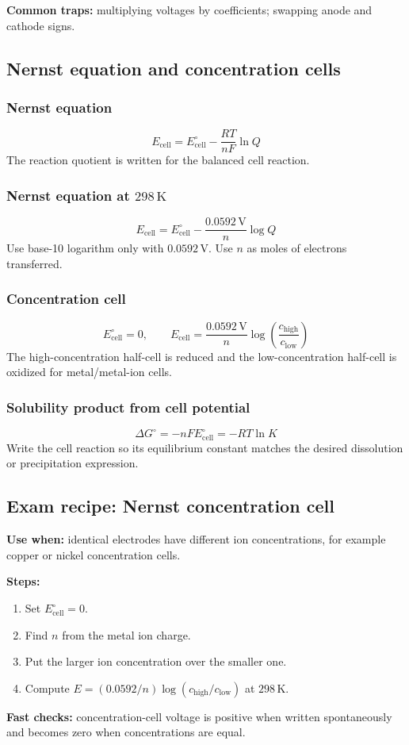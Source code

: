 \textbf{Common traps:} multiplying voltages by coefficients; swapping anode and cathode signs.

\subsection{Nernst equation and concentration cells}

\subsubsection{Nernst equation}
\[
E_{\mathrm{cell}}=E^\circ_{\mathrm{cell}}-\frac{RT}{nF}\ln Q
\]
The reaction quotient is written for the balanced cell reaction.

\subsubsection{Nernst equation at \(298\,\mathrm K\)}
\[
E_{\mathrm{cell}}=E^\circ_{\mathrm{cell}}-\frac{0.0592\,\mathrm V}{n}\log Q
\]
Use base-10 logarithm only with \(0.0592\,\mathrm V\). Use \(n\) as moles of electrons transferred.

\subsubsection{Concentration cell}
\[
E^\circ_{\mathrm{cell}}=0, \qquad
E_{\mathrm{cell}}=\frac{0.0592\,\mathrm V}{n}\log\left(\frac{c_{\mathrm{high}}}{c_{\mathrm{low}}}\right)
\]
The high-concentration half-cell is reduced and the low-concentration half-cell is oxidized for metal/metal-ion cells.

\subsubsection{Solubility product from cell potential}
\[
\Delta G^\circ=-nFE^\circ_{\mathrm{cell}}=-RT\ln K
\]
Write the cell reaction so its equilibrium constant matches the desired dissolution or precipitation expression.

\subsection{Exam recipe: Nernst concentration cell}
\textbf{Use when:} identical electrodes have different ion concentrations, for example copper or nickel concentration cells.

\textbf{Steps:}
\begin{enumerate}
    \item Set \(E^\circ_{\mathrm{cell}}=0\).
    \item Find \(n\) from the metal ion charge.
    \item Put the larger ion concentration over the smaller one.
    \item Compute \(E=(0.0592/n)\log(c_{\mathrm{high}}/c_{\mathrm{low}})\) at \(298\,\mathrm K\).
\end{enumerate}

\textbf{Fast checks:} concentration-cell voltage is positive when written spontaneously and becomes zero when concentrations are equal.
